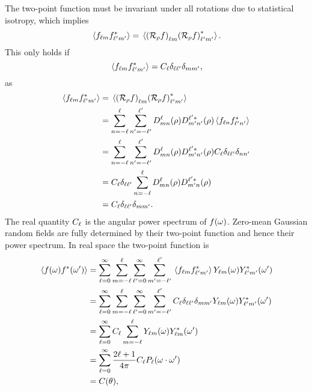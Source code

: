 The two-point function must be invariant under all rotations due to statistical isotropy, which implies
%
\begin{equation}
    \expval*{\harmonic{f} \conj{\harmonic[']{f}}}
    = \expval*{\harmonic{(\rotation{\rho}f)}\conj{\harmonic[']{(\rotation{\rho}f)}}}.
\end{equation}
%
This only holds if
%
\begin{equation}
    \expval*{\harmonic{f} \conj{\harmonic[']{f}}}
    = \powerSpectrum \delta_{\ell\ell'} \delta_{m m'},
\end{equation}
%
as
%
\begin{align}
    \expval*{\harmonic{f} \conj{\harmonic[']{f}}}
     & = \expval*{\harmonic{(\rotation{\rho}f)}\conj{\harmonic[']{(\rotation{\rho}f)}}} \nonumber{}                                                                \\
     & = \wignerSum \wignerSum['] \wigner{\ell}{m}{n}(\rho) \wigner[\ast]{\ell'}{m'}{n'}(\rho) \expval*{f_{\ell n} \conj{f_{\ell' n'}}} \nonumber{}         \\
     & = \wignerSum \wignerSum['] \wigner{\ell}{m}{n}(\rho) \wigner[\ast]{\ell'}{m'}{n'}(\rho) \powerSpectrum \delta_{\ell \ell'} \delta_{n n'} \nonumber{} \\
     & = \powerSpectrum \delta_{\ell\ell'} \wignerSum \wigner{\ell}{m}{n}(\rho) \wigner[\ast]{\ell'}{m'}{n}(\rho) \nonumber{}                               \\
     & = \powerSpectrum \delta_{\ell\ell'} \delta_{m m'}.
\end{align}
%
The real quantity \(\powerSpectrum{}\) is the angular power spectrum of \(\pixel{f}\).
Zero-mean Gaussian random fields are fully determined by their two-point function and hence their power spectrum.
In real space the two-point function is
%
\begin{align}
    \expval*{f(\omega) \conj{f}(\omega')}
     & = \sum\limits_{\ell=0}^{\infty} \sum\limits_{m=-\ell}^{\ell} \sum\limits_{\ell'=0}^{\infty} \sum\limits_{m'=-\ell'}^{\ell'} \expval*{\harmonic{f} \conj{\harmonic[']{f}}} \harmonic{Y}(\omega) \conj{\harmonic[']{Y}}(\omega') \nonumber{}   \\
     & = \sum\limits_{\ell=0}^{\infty} \sum\limits_{m=-\ell}^{\ell} \sum\limits_{\ell'=0}^{\infty} \sum\limits_{m'=-\ell'}^{\ell'} \powerSpectrum \delta_{\ell\ell'} \delta_{m m'} \harmonic{Y}(\omega) \conj{\harmonic[']{Y}}(\omega') \nonumber{} \\
     & = \sum\limits_{\ell=0}^{\infty} \powerSpectrum \sum\limits_{m=-\ell}^{\ell} \harmonic{Y}(\omega) \conj{\harmonic{Y}}(\omega') \nonumber{}                                                                                                    \\
     & = \sum\limits_{\ell=0}^{\infty} \factor \powerSpectrum P_{\ell}(\omega\cdot\omega')  \nonumber{}                                                                                                                                             \\
     & = C(\theta),
\end{align}
